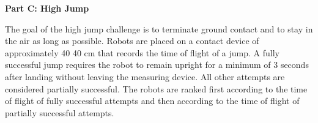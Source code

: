 \clearpage
\sffamily
{\bfseries \color[rgb]{0.4,0.4,0.4} Part C: High Jump}

\bigskip

The goal of the high jump challenge is to terminate ground contact and to stay in the air as long as possible. Robots are placed on a contact device of approximately 40 {\texttimes} 40 cm that records the time of
flight of a jump. A fully successful jump requires the robot to remain upright for a minimum of 3 seconds after landing without leaving the measuring device. All other attempts are considered partially successful. The robots are ranked first according to the time of flight of fully successful attempts and then according to the time of flight of partially successful attempts.